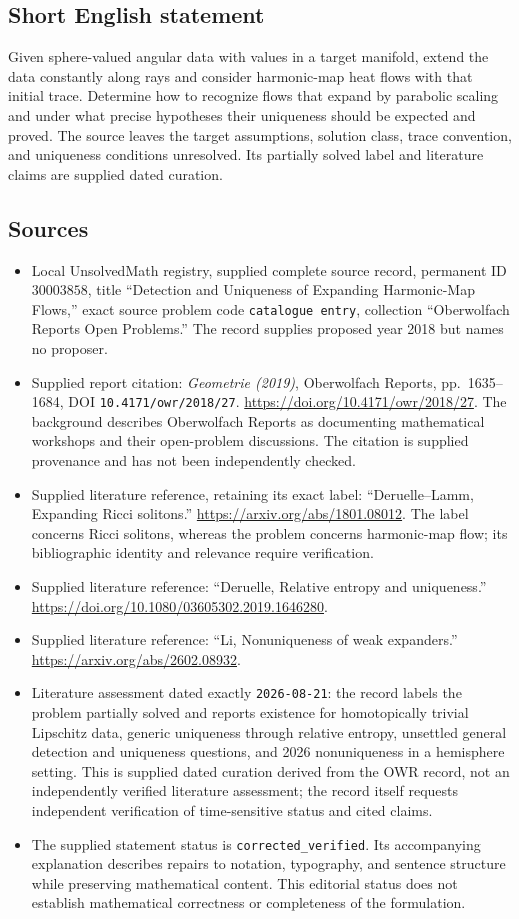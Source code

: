 \documentclass[11pt]{article}
\begin{document}
\subsection{Short English statement}
Given sphere-valued angular data with values in a target manifold, extend the data constantly along rays and consider harmonic-map heat flows with that initial trace. Determine how to recognize flows that expand by parabolic scaling and under what precise hypotheses their uniqueness should be expected and proved. The source leaves the target assumptions, solution class, trace convention, and uniqueness conditions unresolved. Its partially solved label and literature claims are supplied dated curation.
\subsection{Sources}
\begin{itemize}
\item Local UnsolvedMath registry, supplied complete source record, permanent ID \(30003858\), title ``Detection and Uniqueness of Expanding Harmonic-Map Flows,'' exact source problem code \texttt{catalogue entry}, collection ``Oberwolfach Reports Open Problems.'' The record supplies proposed year 2018 but names no proposer.
\item Supplied report citation: \emph{Geometrie (2019)}, Oberwolfach Reports, pp.~1635--1684, DOI \texttt{10.4171/owr/2018/27}. \url{https://doi.org/10.4171/owr/2018/27}. The background describes Oberwolfach Reports as documenting mathematical workshops and their open-problem discussions. The citation is supplied provenance and has not been independently checked.
\item Supplied literature reference, retaining its exact label: ``Deruelle--Lamm, Expanding Ricci solitons.'' \url{https://arxiv.org/abs/1801.08012}. The label concerns Ricci solitons, whereas the problem concerns harmonic-map flow; its bibliographic identity and relevance require verification.
\item Supplied literature reference: ``Deruelle, Relative entropy and uniqueness.'' \url{https://doi.org/10.1080/03605302.2019.1646280}.
\item Supplied literature reference: ``Li, Nonuniqueness of weak expanders.'' \url{https://arxiv.org/abs/2602.08932}.
\item Literature assessment dated exactly \texttt{2026-08-21}: the record labels the problem partially solved and reports existence for homotopically trivial Lipschitz data, generic uniqueness through relative entropy, unsettled general detection and uniqueness questions, and 2026 nonuniqueness in a hemisphere setting. This is supplied dated curation derived from the OWR record, not an independently verified literature assessment; the record itself requests independent verification of time-sensitive status and cited claims.
\item The supplied statement status is \texttt{corrected\_verified}. Its accompanying explanation describes repairs to notation, typography, and sentence structure while preserving mathematical content. This editorial status does not establish mathematical correctness or completeness of the formulation.
\end{itemize}
\end{document}
